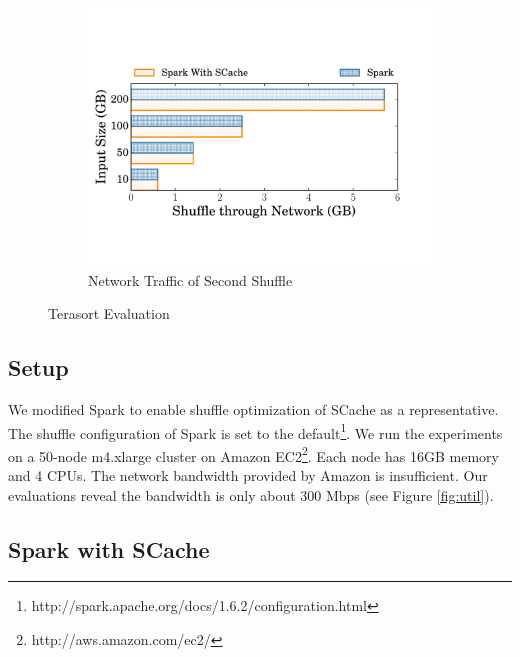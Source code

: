 \begin{figure}
\begin{minipage}[t]{.32\linewidth}
\begin{subfigure}{\linewidth}
			\begin{minipage}{\linewidth}
				\vspace{0.5em}
				\includegraphics[width=\linewidth]{fig/tera_shuffle}
				\caption{Network Traffic of Second Shuffle}
				\label{fig:terashuffle}
			\end{minipage}
		\end{subfigure}
		\caption{Terasort Evaluation}
	\end{minipage}
\end{figure}

\subsection{Setup}\label{stepup}
We modified Spark to enable shuffle optimization of SCache as a representative.
The shuffle configuration of Spark is set to the default\footnote{http://spark.apache.org/docs/1.6.2/configuration.html}. 
We run the experiments on a 50-node m4.xlarge cluster on Amazon EC2\footnote{http://aws.amazon.com/ec2/}. 
Each node has 16GB memory and 4 CPUs. The network bandwidth provided by Amazon is insufficient. 
Our evaluations reveal the bandwidth is only about 300 Mbps (see Figure \ref{fig:util}).

\subsection{Spark with SCache}\label{sparkscache}


